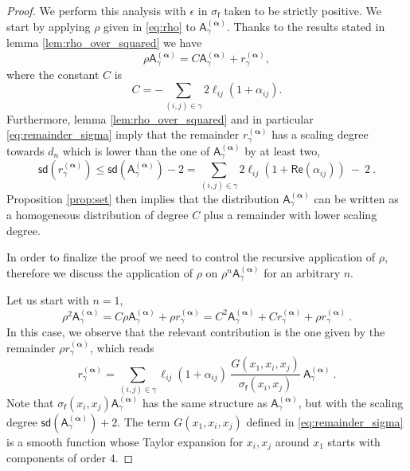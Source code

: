 \documentclass[11pt]{book}
\newcommand{\sd}{\mathsf{sd}}
\renewcommand{\Re}{\mathsf{Re}}
\newcommand{\alphabd}{\boldsymbol{\alpha}}
\newcommand{\Asf}{\mathsf{A}}
\newcommand{\fsf}{\mathsf{f}}
\theoremstyle{break}
\begin{document}
\begin{proof}
We perform this analysis with $\epsilon$ in $\sigma_\fsf$ taken to be strictly positive. We start by applying $\rho$ given in \eqref{eq:rho} to $\Asf_\gamma^{(\alphabd)}$. Thanks to the results stated in lemma \ref{lem:rho_over_squared} we have
%
\begin{equation*}
\rho \Asf_\gamma^{(\alphabd)} = C \Asf_\gamma^{(\alphabd)} + r^{(\alphabd)}_\gamma, 
\end{equation*}
%
where the constant $C$ is
%
\begin{equation*}
C = - \sum_{(i,j)\in\gamma} 2 \ell_{ij}(1+ \alpha_{ij}). 
\end{equation*}
%
Furthermore, lemma \ref{lem:rho_over_squared} and in particular \eqref{eq:remainder_sigma} imply that the remainder $r^{(\alphabd)}_\gamma$ has a scaling degree towards $d_n$ which is lower than the one of $\Asf_\gamma^{(\alphabd)}$ by at least two,
%
\begin{equation}\label{eq:sd_tgamma}
\sd\left(r^{(\alphabd)}_\gamma\right) \leq \sd\left(\Asf_\gamma^{(\alphabd)}\right) - 2 = \sum_{(i,j)\in\gamma} 2 \ell_{ij}\left(1+ \Re(\alpha_{ij})\right) \ - \ 2 \ .
\end{equation}
%
Proposition \ref{prop:set} then implies that the distribution $\Asf_\gamma^{(\alphabd)}$ can be written as a homogeneous distribution of degree $C$ plus a remainder with lower scaling degree.\par%
%
%
In order to finalize the proof we need to control the recursive application of $\rho$, therefore we discuss the application of $\rho$ on $\rho^n \Asf_\gamma^{(\alphabd)}$ for an arbitrary $n$.\par%
%
Let us start with $n=1$,
%
\begin{equation*}
\rho^2 \Asf_\gamma^{(\alphabd)} = C \rho \Asf_\gamma^{(\alphabd)} + \rho r^{(\alphabd)}_\gamma  = C^2 \Asf_\gamma^{(\alphabd)} + C r^{(\alphabd)}_\gamma + \rho r^{(\alphabd)}_\gamma \ .
\end{equation*}
%
In this case, we observe that the relevant contribution is the one given by the remainder $\rho r^{(\alphabd)}_\gamma$, which reads 
%
\begin{equation*}
r^{(\alphabd)}_\gamma = \sum_{(i,j)\in\gamma} \ell_{ij}(1+ \alpha_{ij}) \ \frac{G(x_1,x_i,x_j)}{\sigma_\fsf(x_i,x_j)} \ \Asf_\gamma^{(\alphabd)} \ .
\end{equation*}
%
Note that $\sigma_\fsf(x_i,x_j) \Asf_\gamma^{(\alphabd)}$ has the same structure as $\Asf_\gamma^{(\alphabd)}$, but with the scaling degree $\sd(\Asf_\gamma^{(\alphabd)}) + 2$. The term $G(x_1,x_i,x_j)$ defined in \eqref{eq:remainder_sigma} is a smooth function whose Taylor expansion for $x_i, x_j$ around $x_1$ starts with components of order $4$.\par

\end{proof}
\end{document}
